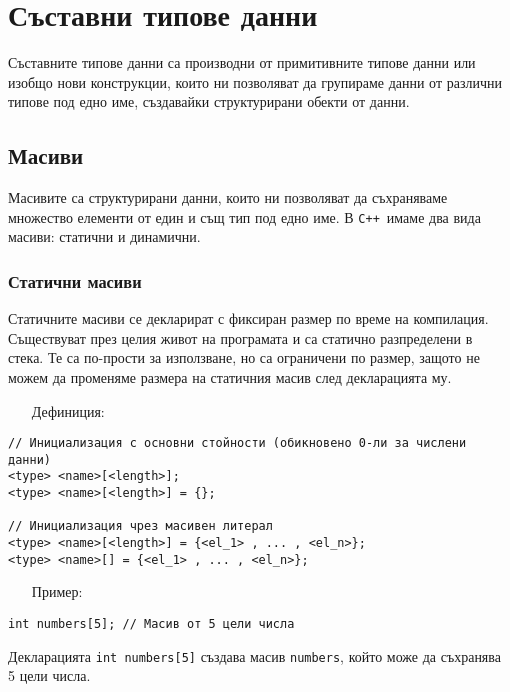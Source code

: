 \documentclass[oneside]{book}
\newcommand*{\code}[1]{\texttt{#1}}
\newcommand*{\cpp}{\texttt{C++}\ }
\begin{document}
\chapter{Съставни типове данни}
Съставните типове данни са производни от примитивните типове данни или изобщо нови конструкции, които ни позволяват да групираме данни от различни типове под едно име, създавайки структурирани обекти от данни. 

\section{Масиви}\label{sec:array}
Масивите са структурирани данни, които ни позволяват да съхраняваме множество елементи от един и същ тип под едно име. В \cpp имаме два вида масиви: статични и динамични.

\subsection{Статични масиви}
Статичните масиви се декларират с фиксиран размер по време на компилация.
Съществуват през целия живот на програмата и са статично разпределени в стека.
Те са по-прости за използване, но са ограничени по размер, защото не можем да променяме размера на статичния масив след декларацията му.

\begin{itemize}\item[Дефиниция:]\end{itemize}
\begin{mdframed}\begin{lstlisting}
// Инициализация с основни стойности (обикновено 0-ли за числени данни)
<type> <name>[<length>];
<type> <name>[<length>] = {};

// Инициализация чрез масивен литерал
<type> <name>[<length>] = {<el_1> , ... , <el_n>}; 
<type> <name>[] = {<el_1> , ... , <el_n>};
\end{lstlisting}\end{mdframed}
\pagebreak
\begin{itemize}\item[Пример:]\end{itemize}\vspace{-12pt}
\begin{mdframed}\begin{lstlisting}
int numbers[5]; // Масив от 5 цели числа
\end{lstlisting}\end{mdframed}

Декларацията \code{int numbers[5]} създава масив \code{numbers}, който може да съхранява 5 цели числа.
\end{document}
